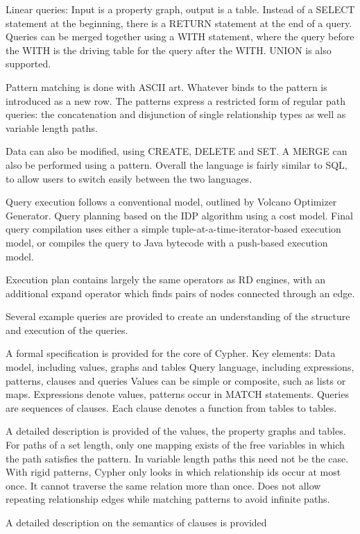 Linear queries: Input is a property graph, output is a table. Instead of a SELECT statement at the beginning, there is a RETURN statement at the end of a query.
Queries can be merged together using a WITH statement, where the query before the WITH is the driving table for the query after the WITH. UNION is also supported. 

Pattern matching is done with ASCII art. Whatever binds to the pattern is introduced as a new row. The patterns express a restricted form of regular path queries: the concatenation and disjunction of single relationship types as well as variable length paths. 

Data can also be modified, using CREATE, DELETE and SET. A MERGE can also be performed using a pattern.
Overall the language is fairly similar to SQL, to allow users to switch easily between the two languages. 

Query execution follows a conventional model, outlined by Volcano Optimizer Generator. Query planning based on the IDP algorithm using a cost model. Final query compilation uses either a simple tuple-at-a-time-iterator-based execution model, or compiles the query to Java bytecode with a push-based execution model. 

Execution plan contains largely the same operators as RD engines, with an additional expand operator which finds pairs of nodes connected through an edge.

Several example queries are provided to create an understanding of the structure and execution of the queries. 

A formal specification is provided for the core of Cypher. 
Key elements: 
Data model, including values, graphs and tables
Query language, including expressions, patterns, clauses and queries
Values can be simple or composite, such as lists or maps. Expressions denote values, patterns occur in MATCH statements. Queries are sequences of clauses. Each clause denotes a function from tables to tables. 

A detailed description is provided of the values, the property graphs and tables. 
For paths of a set length, only one mapping exists of the free variables in which the path satisfies the pattern. In variable length paths this need not be the case. 
With rigid patterns, Cypher only looks in which relationship ids occur at most once. It cannot traverse the same relation more than once. Does not allow repeating relationship edges while matching patterns to avoid infinite paths. 

A detailed description on the semantics of clauses is provided


